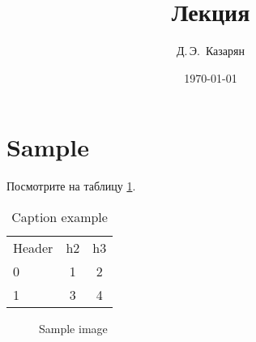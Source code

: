 \documentclass[a4paper,12pt]{article}
\title{Лекция \textnumero2}
\date{\today}
\author{Д.\,Э.~Казарян}
\begin{document}
\maketitle

\tableofcontents
\listoftables
\listoffigures

\section{Sample}

\begin{center}
    \lipsum[1]
\end{center}

Посмотрите на таблицу \ref{t:sample}.

\begin{table}[h!]
    \centering
    \begin{tabular}{|b{}||cc|}
        Header & h2 & h3 \\
        0 & 1 & 2 \\
        \cline{1-2}
        1 & 3 & 4 \\
    \end{tabular}
    \caption{Caption example}
    \label{t:sample}
\end{table}

\lipsum[2]

\begin{wrapfigure}{r}{0.7\textwidth}
     \centering
     \caption{Sample image}
     \label{i:img1}
\end{wrapfigure}

\lipsum[3-10]
\end{document}
